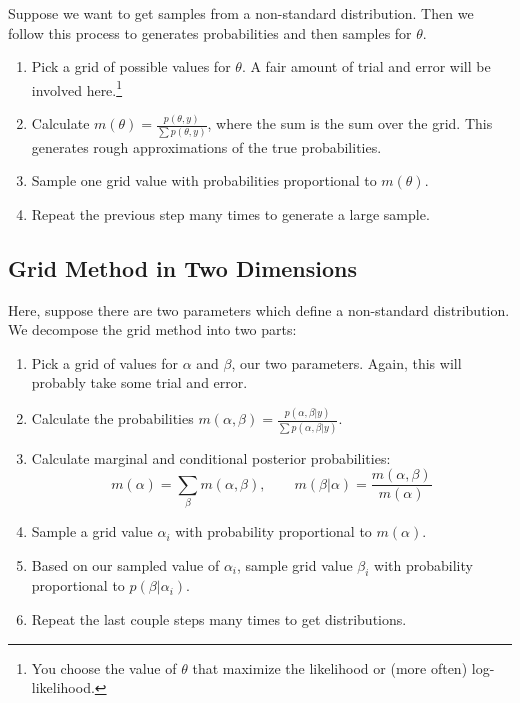 \documentclass[12pt]{article}
\begin{document}
Suppose we want to get samples from a non-standard distribution. Then
we follow this process to generates probabilities and then samples for 
$\theta$. 
\begin{enumerate}
   \item Pick a grid of possible values for $\theta$. A fair amount
      of trial and error will be involved here.\footnote{You choose
      the value of $\theta$ that maximize the likelihood or
      (more often) log-likelihood.}
   \item Calculate $m(\theta) = \frac{p(\theta, y)}{\sum p(\theta, y)}$,
      where the sum is the sum over the grid. This generates rough
      approximations of the true probabilities.
   \item Sample one grid value with probabilities proportional to 
      $m(\theta)$.
   \item Repeat the previous step many times to generate a large sample.
\end{enumerate}

\subsection{Grid Method in Two Dimensions} 

Here, suppose there are two parameters which define a non-standard
distribution. We decompose the grid method into two parts:
\begin{enumerate}
   \item Pick a grid of values for $\alpha$ and $\beta$, our two 
      parameters. Again, this will probably take some trial and 
      error.
   \item Calculate the probabilities $m(\alpha, \beta) = \frac{ 
      p(\alpha, \beta |y)}{\sum p(\alpha, \beta | y)}$.
   \item Calculate marginal and conditional posterior probabilities:
      \[ m(\alpha) = \sum_\beta m(\alpha, \beta), \qquad 
	 m(\beta|\alpha) = \frac{m(\alpha, \beta)}{m(\alpha)}\]
   \item Sample a grid value $\alpha_i$ with probability proportional
      to $m(\alpha)$. 
   \item Based on our sampled value of $\alpha_i$, sample grid value
      $\beta_i$ with probability proportional to $p(\beta | \alpha_i)$.
   \item Repeat the last couple steps many times to get distributions.
\end{enumerate}
\end{document}
